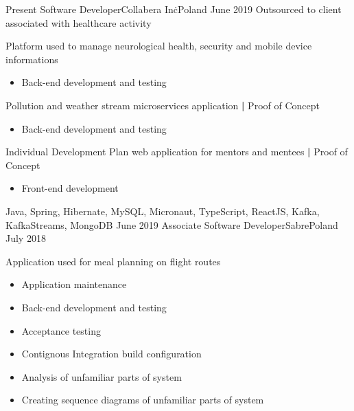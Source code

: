 
\begin{experiences}
  \contractorexperience
    {Present}   {Software Developer}{Collabera Inc\.}{Poland}
    {June 2019} {Outsourced to client associated with healthcare activity}
                {
                        Platform used to manage neurological health, security and mobile device informations
                        \begin{itemize}
                            \item Back-end development and testing      
                        \end{itemize}
                        Pollution and weather stream microservices application \textbf{|} \small{Proof of Concept}\normalsize
                        \begin{itemize}
                            \item Back-end development and testing  
                        \end{itemize}
                        Individual Development Plan web application for mentors and mentees \textbf{|} \small{Proof of Concept}\normalsize
                        \begin{itemize}
                            \item Front-end development
                        \end{itemize}
                    }
                    {Java, Spring, Hibernate, MySQL, Micronaut, TypeScript, ReactJS, Kafka, KafkaStreams, MongoDB}
  \emptySeparator
  \experience
    {June 2019} {Associate Software Developer}{Sabre}{Poland}
    {July 2018}    {
                        Application used for meal planning on flight routes
                        \begin{itemize}
                            \item Application maintenance
                            \item Back-end development and testing
                            \item Acceptance testing
                            \item Contignous Integration build configuration
                            \item Analysis of unfamiliar parts of system
                            \item Creating sequence diagrams of unfamiliar parts of system  

\end{itemize}}
\end{experiences}
